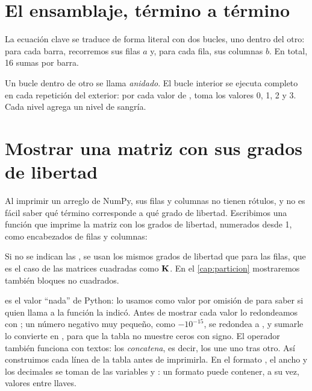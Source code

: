 \section{El ensamblaje, término a término}\label{sec:doble_bucle}

La ecuación clave se traduce de forma literal con dos bucles, uno dentro del
otro: para cada barra, recorremos sus filas $a$ y, para cada fila, sus
columnas $b$. En total, 16 sumas por barra.

\begin{python}
Un bucle dentro de otro se llama \emph{anidado}. El bucle interior se
ejecuta completo en cada repetición del exterior: por cada valor de ,
 toma los valores 0, 1, 2 y 3. Cada nivel agrega un nivel de sangría.
\end{python}

\section{Mostrar una matriz con sus grados de libertad}\label{sec:mostrar_matriz}

Al imprimir un arreglo de NumPy, sus filas y columnas no tienen rótulos, y no
es fácil saber qué término corresponde a qué grado de libertad. Escribimos una
función que imprime la matriz con los grados de libertad, numerados desde 1,
como encabezados de filas y columnas:

Si no se indican las , se usan los mismos grados de libertad que
para las filas, que es el caso de las matrices cuadradas como $\mathbf{K}$. En el
\cref{cap:particion} mostraremos también bloques no cuadrados.

\begin{python}
 es el valor \enquote{nada} de Python: lo usamos como valor por
omisión de  para saber si quien llama a la función la indicó.
Antes de mostrar cada valor lo redondeamos con ; un número
negativo muy pequeño, como $-10^{-15}$, se redondea a , y sumarle
 lo convierte en , para que la tabla no muestre ceros con
signo.
El operador \py{+=} también funciona con textos: los \emph{concatena}, es
decir, los une uno tras otro. Así construimos cada línea de la tabla antes de
imprimirla. En el formato , el ancho y los
decimales se toman de las variables  y : un formato
puede contener, a su vez, valores entre llaves.
\end{python}


